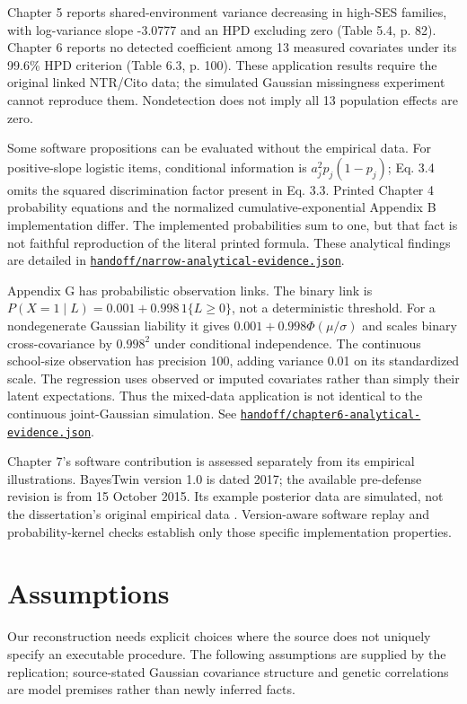\documentclass[11pt]{article}
\newcommand{\file}[1]{\href{https://github.com/alectionary/vibe-math/blob/master/formalization/schwabe-psychometric-genetics/#1}{\nolinkurl{#1}}}
\begin{document}
Chapter 5 reports shared-environment variance decreasing in high-SES families, with log-variance slope -3.0777 and an HPD excluding zero (Table 5.4, p. 82). Chapter 6 reports no detected coefficient among 13 measured covariates under its 99.6\% HPD criterion (Table 6.3, p. 100). These application results require the original linked NTR/Cito data; the simulated Gaussian missingness experiment cannot reproduce them. Nondetection does not imply all 13 population effects are zero.

Some software propositions can be evaluated without the empirical data. For positive-slope logistic items, conditional information is $a_j^2p_j(1-p_j)$; Eq. 3.4 omits the squared discrimination factor present in Eq. 3.3. Printed Chapter 4 probability equations and the normalized cumulative-exponential Appendix B implementation differ. The implemented probabilities sum to one, but that fact is not faithful reproduction of the literal printed formula. These analytical findings are detailed in \file{handoff/narrow-analytical-evidence.json}.

Appendix G has probabilistic observation links. The binary link is $P(X=1\mid L)=0.001+0.998\,1\{L\geq0\}$, not a deterministic threshold. For a nondegenerate Gaussian liability it gives $0.001+0.998\Phi(\mu/\sigma)$ and scales binary cross-covariance by $0.998^2$ under conditional independence. The continuous school-size observation has precision 100, adding variance 0.01 on its standardized scale. The regression uses observed or imputed covariates rather than simply their latent expectations. Thus the mixed-data application is not identical to the continuous joint-Gaussian simulation. See \file{handoff/chapter6-analytical-evidence.json}.

Chapter 7's software contribution is assessed separately from its empirical illustrations. BayesTwin version 1.0 is dated 2017; the available pre-defense revision is from 15 October 2015. Its example posterior data are simulated, not the dissertation's original empirical data \citep{bayestwin}. Version-aware software replay and probability-kernel checks establish only those specific implementation properties.

\section{Assumptions}\label{sec:assumptions}
Our reconstruction needs explicit choices where the source does not uniquely specify an executable procedure. The following assumptions are supplied by the replication; source-stated Gaussian covariance structure and genetic correlations are model premises rather than newly inferred facts.
\end{document}

